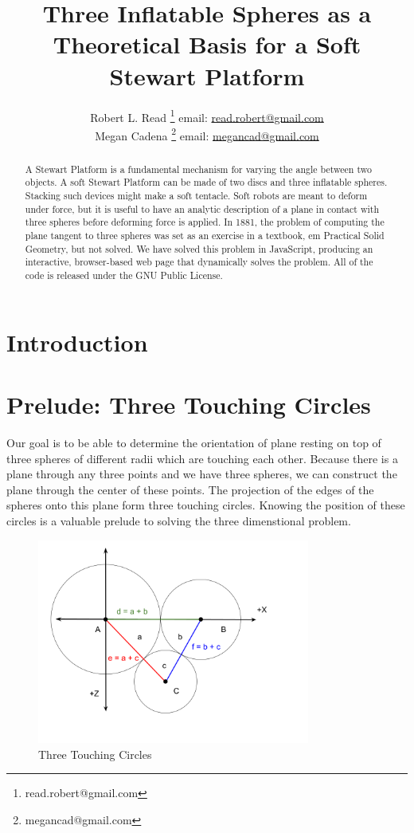 \documentclass{article}
\title{Three Inflatable Spheres as a Theoretical Basis for a Soft Stewart Platform}
\author{Robert L. Read
  \thanks{read.robert@gmail.com}
  email: \href{mailto:read.robert@gmail.com}{read.robert@gmail.com}\\
Megan Cadena
  \thanks{megancad@gmail.com}
  email: \href{mailto:megancad@gmail.com}{megancad@gmail.com}
  }
\begin{document}
\maketitle
\begin{abstract}
  A Stewart Platform\cite{wiki:stewart} is a fundamental mechanism for varying the angle
  between two objects.
  A soft Stewart Platform can be made of two discs and
  three inflatable spheres.
  Stacking such devices might make a soft tentacle.
  Soft robots are meant to deform under force, but it is useful to have
  an analytic description of a plane in contact with three spheres
  before deforming force is applied.
  In 1881, the problem of computing the plane tangent to three spheres was
  set as an exercise in a textbook, {em Practical Solid Geometry}\cite{payne1881},
  but not solved.
  We have solved this problem in JavaScript, producing an interactive,
  browser-based web page that dynamically solves the problem\cite{softrobotcalc}.
  All of the code is released under the GNU Public License.
\end{abstract}


\section{Introduction}


\section{Prelude: Three Touching Circles}

Our goal is to be able to determine the orientation of plane resting
on top of three spheres of different radii which are touching each
other.
Because there is a plane through any three points and we have three spheres, we can construct the plane through
the center of these points.
The projection of the edges of the spheres onto this plane form three touching circles.
Knowing the position of these circles is a valuable prelude to solving the three dimenstional problem.

\begin{figure}
     \centering
     \includegraphics[width=0.8\textwidth]{figures/ThreeTouchingPlanarCircles.png}
     \caption{Three Touching Circles}
  \label{fig:Tangent}
\end{figure}
\end{document}
